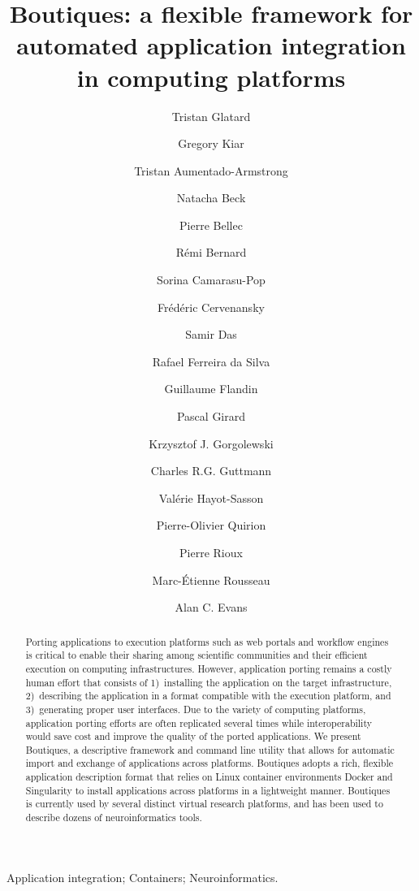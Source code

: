 \documentclass[a4paper,num-refs]{oup-contemporary}
\title{Boutiques: a flexible framework for automated application integration in computing platforms}
\newcommand{\boutiques}{Boutiques\xspace}
\begin{document}
\author[1]{Tristan Glatard}
\author[2,3]{Gregory Kiar}
\author[2,3]{Tristan Aumentado-Armstrong}
\author[2,3]{Natacha Beck}
\author[4]{Pierre Bellec}
\author[2,3]{R\'emi Bernard}
\author[5]{Sorina Camarasu-Pop}
\author[5]{Fr\'ed\'eric Cervenansky}
\author[2,3]{Samir Das}
\author[6]{Rafael Ferreira da Silva}
\author[7]{Guillaume Flandin}
\author[5]{Pascal Girard}
\author[8]{Krzysztof J. Gorgolewski}
\author[9]{Charles R.G. Guttmann}
\author[1]{Val\'erie Hayot-Sasson}
\author[4]{Pierre-Olivier Quirion}
\author[2,3]{Pierre Rioux}
\author[10]{Marc-\'Etienne Rousseau}
\author[2]{Alan C. Evans}


\begin{frontmatter}
\maketitle

\begin{abstract}Porting applications to execution platforms such as web
  portals and workflow engines is critical to enable their sharing
  among scientific communities and their efficient execution on
  computing infrastructures. However, application porting remains a
  costly human effort that consists of 1)~installing the application
  on the target infrastructure, 2)~describing the application in a
  format compatible with the execution platform, and 3)~generating
  proper user interfaces. Due to the variety of computing platforms,
  application porting efforts are often replicated several times while
  interoperability would save cost and improve the quality of the ported
  applications. We present \boutiques, a descriptive framework and
  command line utility that allows for automatic import and exchange of
  applications across platforms. \boutiques adopts a rich, flexible
  application description format that relies on Linux container
  environments Docker and Singularity to install applications
  across platforms in a lightweight manner. \boutiques is currently used
  by several distinct virtual research platforms, and has been used to
  describe dozens of neuroinformatics tools.
\end{abstract}

\begin{keywords}
Application integration; Containers; Neuroinformatics.
\end{keywords}
\end{frontmatter}
\end{document}
